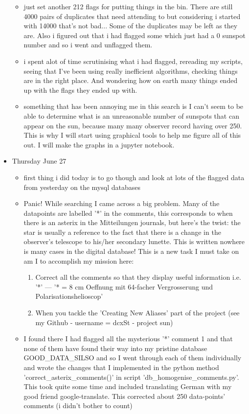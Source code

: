 \documentclass[12pt]{article}
\begin{document}
\begin{itemize}
\begin{itemize}
        \item just set another 212 flags for putting things in the bin. There are still 4000 pairs of duplicates that need attending to but considering i started with 14000 that's not bad... Some of the duplicates may be left as they are. Also i figured out that i had flagged some which just had a 0 sunspot number and so i went and unflagged them.
        \item i spent alot of time scrutinising what i had flagged, rereading my scripts, seeing that I've been using really inefficient algorithms, checking things are in the right place. And wondering how on earth many things ended up with the flags they ended up with.
        \item something that has been annoying me in this search is I can't seem to be able to determine what is an unreasonable number of sunspots that can appear on the sun, because many many observer record having over 250. This is why I will start using graphical tools to help me figure all of this out. I will make the graphs in a jupyter notebook.
    \end{itemize}
    \item Thursday June 27
    \begin{itemize}
        \item first thing i did today is to go though and look at lots of the flagged data from yesterday on the mysql databases
        \item Panic! While searching I came across a big problem. Many of the datapoints are labelled '*' in the comments, this corresponds to when there is an asterix in the Mitteilungen journals, but here's the twist: the star is usually a reference to the fact that there is a change in the observer's telescope to his/her secondary lunette. This is written nowhere is many cases in the digital database! This is a new task I must take on am I to accomplish my mission here:
        \begin{enumerate}
            \item Correct all the comments so that they display useful information i.e. '*' --- '* = 8 cm Oeffnung mit 64-facher Vergrosserung und Polarisationshelioscop'
            \item When you tackle the 'Creating New Aliases' part of the project (see my Github - username = dcxSt - project sun)
        \end{enumerate}
        \item I found there I had flagged all the mysterious '*' comment 1 and that none of them have found their way into my pristine database GOOD\_DATA\_SILSO and so I went through each of them individually and wrote the changes that I implemented in the python method 'correct\_asterix\_comments()' in script 'db\_homogenise\_comments.py'. This took quite some time and included translating German with my good friend google-translate. This corrected about 250 data-points' comments (i didn't bother to count)

\end{itemize}
\end{itemize}
\end{document}
